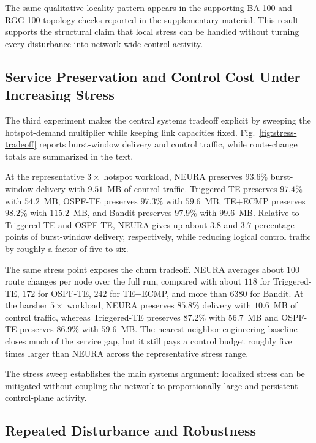 \documentclass[5p,times]{elsarticle}
\begin{document}
The same qualitative locality pattern appears in the supporting BA-100 and RGG-100 topology checks reported in the supplementary material. This result supports the structural claim that local stress can be handled without turning every disturbance into network-wide control activity.



\subsection{Service Preservation and Control Cost Under Increasing Stress}
The third experiment makes the central systems tradeoff explicit by sweeping the hotspot-demand multiplier while keeping link capacities fixed. Fig.~\ref{fig:stress-tradeoff} reports burst-window delivery and control traffic, while route-change totals are summarized in the text.

At the representative $3\times$ hotspot workload, NEURA preserves $93.6\%$ burst-window delivery with $9.51$~MB of control traffic. Triggered-TE preserves $97.4\%$ with $54.2$~MB, OSPF-TE preserves $97.3\%$ with $59.6$~MB, TE+ECMP preserves $98.2\%$ with $115.2$~MB, and Bandit preserves $97.9\%$ with $99.6$~MB. Relative to Triggered-TE and OSPF-TE, NEURA gives up about $3.8$ and $3.7$ percentage points of burst-window delivery, respectively, while reducing logical control traffic by roughly a factor of five to six.

The same stress point exposes the churn tradeoff. NEURA averages about $100$ route changes per node over the full run, compared with about $118$ for Triggered-TE, $172$ for OSPF-TE, $242$ for TE+ECMP, and more than $6380$ for Bandit. At the harsher $5\times$ workload, NEURA preserves $85.8\%$ delivery with $10.6$~MB of control traffic, whereas Triggered-TE preserves $87.2\%$ with $56.7$~MB and OSPF-TE preserves $86.9\%$ with $59.6$~MB. The nearest-neighbor engineering baseline closes much of the service gap, but it still pays a control budget roughly five times larger than NEURA across the representative stress range.

The stress sweep establishes the main systems argument: localized stress can be mitigated without coupling the network to proportionally large and persistent control-plane activity.


\subsection{Repeated Disturbance and Robustness}
\end{document}
